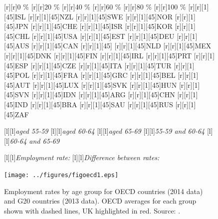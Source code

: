 \documentclass[11 pt, a4paper]{report}
\begin{document}
\begin{figure}[hbtp!]
[r][r]{\small{0 \%}}
[r][r]{\small{20 \%}}
[r][r]{\small{40 \%}}
[r][r]{\small{60 \%}}
[r][r]{\small{80 \%}}
[r][r]{\small{100 \%}}
[r][r][1][45]{\tiny{ISL}}
[r][r][1][45]{\tiny{NZL}}
[r][r][1][45]{\tiny{SWE}}
[r][r][1][45]{\tiny{NOR}}
[r][r][1][45]{\tiny{JPN}}
[r][r][1][45]{\tiny{CHE}}
[r][r][1][45]{\tiny{ISR}}
[r][r][1][45]{\tiny{KOR}}
[r][r][1][45]{\tiny{CHL}}
[r][r][1][45]{\tiny{USA}}
[r][r][1][45]{\tiny{EST}}
[r][r][1][45]{\tiny{DEU}}
[r][r][1][45]{\tiny{AUS}}
[r][r][1][45]{\tiny{CAN}}
[r][r][1][45]{\tiny{\color{red}{GBR}}}
[r][r][1][45]{\tiny{NLD}}
[r][r][1][45]{\tiny{MEX}}
[r][r][1][45]{\tiny{DNK}}
[r][r][1][45]{\tiny{FIN}}
[r][r][1][45]{\tiny{IRL}}
[r][r][1][45]{\tiny{PRT}}
[r][r][1][45]{\tiny{ESP}}
[r][r][1][45]{\tiny{CZE}}
[r][r][1][45]{\tiny{ITA}}
[r][r][1][45]{\tiny{TUR}}
[r][r][1][45]{\tiny{POL}}
[r][r][1][45]{\tiny{FRA}}
[r][r][1][45]{\tiny{GRC}}
[r][r][1][45]{\tiny{BEL}}
[r][r][1][45]{\tiny{AUT}}
[r][r][1][45]{\tiny{LUX}}
[r][r][1][45]{\tiny{SVK}}
[r][r][1][45]{\tiny{HUN}}
[r][r][1][45]{\tiny{SVN}}
[r][r][1][45]{\tiny{IDN}}
[r][r][1][45]{\tiny{ARG}}
[r][r][1][45]{\tiny{CHN}}
[r][r][1][45]{\tiny{IND}}
[r][r][1][45]{\tiny{BRA}}
[r][r][1][45]{\tiny{SAU}}
[r][r][1][45]{\tiny{RUS}}
[r][r][1][45]{\tiny{ZAF}}

[l][l]{\scriptsize{\emph{aged 55-59}}}
[l][l]{\scriptsize{\emph{aged 60-64}}}
[l][l]{\scriptsize{\emph{aged 65-69}}}
[l][l]{\scriptsize{\emph{55-59 and 60-64}}}
[l][l]{\scriptsize{\emph{60-64 and 65-69}}}

[l][l]{\scriptsize{\emph{Employment rate:}}}
[l][l]{\scriptsize{\emph{Difference between rates:}}}

                           

\texttt{[image: ../figures/figoecd1.eps]}
\caption{Employment rates by age group for OECD countries (2014 data) and G20 countries (2013 data). OECD averages for each group shown with dashed lines, UK highlighted in red. Source: \cite{OECD2015}.}
\label{Fig:OECD}
\end{figure}
\end{document}
